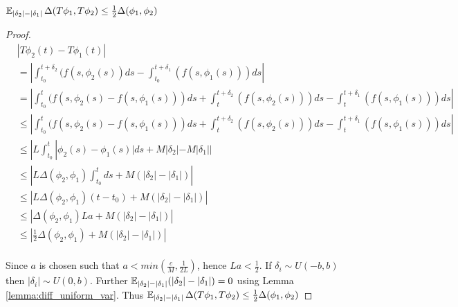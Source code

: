 \begin{lemma}
	$\operatorname{\mathbb{E}}_{|\delta_2|-|\delta_1|}\Delta(T\phi_1,T\phi_2)\leq \frac{1}{2} \Delta(\phi_1,\phi_2)$
	\label{lemma:contraction}
\end{lemma}

\begin{proof}
	\begin{align}
		&  |T\phi_{2}(t) - T\phi_{1}(t)| \nonumber  \\
		&  = | \int_{t_0}^{t+\delta_{2}} (f(s,\phi_{2}(s)) ds - \int_{t_0}^{t+\delta_{1}} ( f(s,\phi_1(s)) ) ds | \nonumber \\
		&  = | \int_{t_0}^{t} (f(s,\phi_{2}(s) - f(s,\phi_1(s)) ) ds  + \int_{t}^{t+\delta_{2}} (f( s , \phi_{2}(s) )) ds - \int_{t}^{t+\delta_{1}} (f( s , \phi_{1}(s) )) ds |  \nonumber \\
		&   \leq | \int_{t_0}^{t}  (f(s,\phi_{2}(s) - f(s,\phi_1(s)) )  ds + \int_{t}^{t+\delta_{2}} (f( s , \phi_{2}(s) )) ds - \int_{t}^{t+\delta_{1}} (f( s , \phi_{1}(s) )) ds| \nonumber \\
		& \leq |L \int_{t_0}^{t} |\phi_{2}(s) - \phi_1(s)| ds + M | \delta_{2}| - M | \delta_1| |   \nonumber \\
		& \leq |L \Delta(\phi_2,\phi_1) \int_{t_0}^{t} ds + M (| \delta_{2}| -  | \delta_1|)  |  \nonumber \\ 
		& \leq |L \Delta(\phi_2,\phi_1) (t-t_0) + M (| \delta_{2}| -  | \delta_1|)  |  \nonumber \\ 
		& \leq |\Delta(\phi_2,\phi_1) La  + M (| \delta_{2}| -  | \delta_1|) |  \nonumber \\
		& \leq |\frac{1}{2} \Delta(\phi_2,\phi_1) + M(| \delta_{2}| -  | \delta_1|) |   \nonumber \\ %
	\end{align}
	
	Since $a$ is chosen such that $a < min(\frac{c}{M},\frac{1}{2L})$, hence $La<\frac{1}{2}$. If $\delta_i \sim U(-b,b)$ then $|\delta_i| \sim U(0,b)$. Further $\operatorname{\mathbb{E}}_{|\delta_2|-|\delta_1|} ( |\delta_{2}| -  | \delta_1|)=0$ using Lemma \ref{lemma:diff_uniform_var}. Thus $\operatorname{\mathbb{E}}_{|\delta_2|-|\delta_1|}\Delta(T\phi_1,T\phi_2)\leq \frac{1}{2} \Delta(\phi_1,\phi_2)$
\end{proof}

